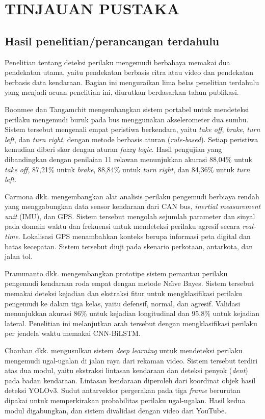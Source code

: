 \chapter{TINJAUAN PUSTAKA}

\section{Hasil penelitian/perancangan terdahulu}
Penelitian tentang deteksi perilaku mengemudi berbahaya memakai dua pendekatan utama, yaitu pendekatan berbasis citra atau video dan pendekatan berbasis data kendaraan. Bagian ini menguraikan lima belas penelitian terdahulu yang menjadi acuan penelitian ini, diurutkan berdasarkan tahun publikasi.

Boonmee dan Tangamchit mengembangkan sistem portabel untuk mendeteksi perilaku mengemudi buruk pada bus menggunakan akselerometer dua sumbu. Sistem tersebut mengenali empat peristiwa berkendara, yaitu \textit{take off}, \textit{brake}, \textit{turn left}, dan \textit{turn right}, dengan metode berbasis aturan (\textit{rule-based}). Setiap peristiwa kemudian diberi skor dengan aturan \textit{fuzzy logic}. Hasil pengujian yang dibandingkan dengan penilaian 11 relawan menunjukkan akurasi 88,04\% untuk \textit{take off}, 87,21\% untuk \textit{brake}, 88,84\% untuk \textit{turn right}, dan 84,36\% untuk \textit{turn left}.

Carmona dkk. mengembangkan alat analisis perilaku pengemudi berbiaya rendah yang menggabungkan data sensor kendaraan dari CAN bus, \textit{inertial measurement unit} (IMU), dan GPS. Sistem tersebut mengolah sejumlah parameter dan sinyal pada domain waktu dan frekuensi untuk mendeteksi perilaku agresif secara \textit{real-time}. Lokalisasi GPS menambahkan konteks berupa informasi peta digital dan batas kecepatan. Sistem tersebut diuji pada skenario perkotaan, antarkota, dan jalan tol.

Pramunanto dkk. mengembangkan prototipe sistem pemantau perilaku pengemudi kendaraan roda empat dengan metode Na\"{\i}ve Bayes. Sistem tersebut memakai deteksi kejadian dan ekstraksi fitur untuk mengklasifikasi perilaku pengemudi ke dalam tiga kelas, yaitu defensif, normal, dan agresif. Validasi menunjukkan akurasi 86\% untuk kejadian longitudinal dan 95,8\% untuk kejadian lateral. Penelitian ini melanjutkan arah tersebut dengan mengklasifikasi perilaku per jendela waktu memakai CNN-BiLSTM.

Chauhan dkk. mengusulkan sistem \textit{deep learning} untuk mendeteksi perilaku mengemudi ugal-ugalan di jalan raya dari rekaman video. Sistem tersebut terdiri atas dua modul, yaitu ekstraksi lintasan kendaraan dan deteksi penyok (\textit{dent}) pada badan kendaraan. Lintasan kendaraan diperoleh dari koordinat objek hasil deteksi YOLOv3. Sudut antarvektor pergerakan pada tiga \textit{frame} berurutan dipakai untuk memperkirakan probabilitas perilaku ugal-ugalan. Hasil kedua modul digabungkan, dan sistem divalidasi dengan video dari YouTube.

